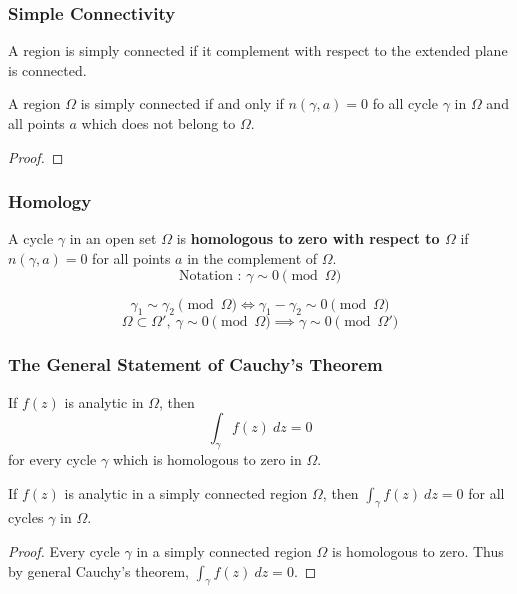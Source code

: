 \subsubsection{Simple Connectivity}
\begin{definition}
	A region is simply connected if it complement with respect to the extended plane is connected.
\end{definition}

\begin{theorem}
	A region $\Omega$ is simply connected if and only if $n(\gamma,a) = 0$ fo all cycle $\gamma$ in $\Omega$ and all points $a$ which does not belong to $\Omega$.
\end{theorem}
\begin{proof}
\end{proof}

\subsubsection{Homology}
\begin{definition}
	A cycle $\gamma$ in an open set $\Omega$ is \textbf{homologous to zero with respect to $\Omega$} if $n(\gamma,a)=0$ for all points $a$ in the complement of $\Omega$.
	\[ \text{Notation : } \gamma \sim 0 \!\!\! \pmod{\Omega} \]
\end{definition}
\begin{remark}
	\[ \gamma_1 \sim \gamma_2 \!\!\! \pmod{\Omega} \iff \gamma_1-\gamma_2 \sim 0 \!\!\! \pmod{\Omega} \]
	\[ \Omega \subset \Omega',\ \gamma \sim 0 \!\!\! \pmod{\Omega} \implies \gamma \sim 0 \!\!\! \pmod{\Omega'} \]
\end{remark}

\subsubsection{The General Statement of Cauchy's Theorem}
\begin{theorem}
	If $f(z)$ is analytic in $\Omega$, then
	\[ \int_\gamma f(z)\ dz = 0 \]
	for every cycle $\gamma$ which is homologous to zero in $\Omega$.
\end{theorem}
\begin{corollary}
	If $f(z)$ is analytic in a simply connected region $\Omega$, then $ \int_\gamma f(z)\ dz = 0$ for all cycles $\gamma$ in $\Omega$.
\end{corollary}
\begin{proof}
	Every cycle $\gamma$ in a simply connected region $\Omega$ is homologous to zero.
	Thus by general Cauchy's theorem, $\int_\gamma f(z)\ dz = 0$.
\end{proof}

